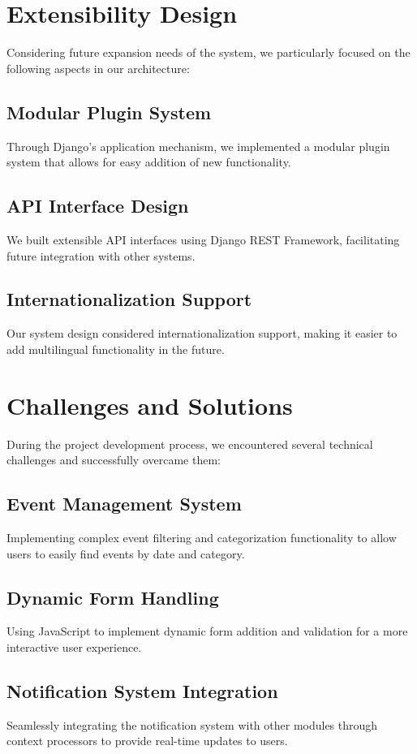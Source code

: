 \section{Extensibility Design}

Considering future expansion needs of the system, we particularly focused on the following aspects in our architecture:

\subsection{Modular Plugin System}
Through Django's application mechanism, we implemented a modular plugin system that allows for easy addition of new functionality.

\subsection{API Interface Design}
We built extensible API interfaces using Django REST Framework, facilitating future integration with other systems.

\subsection{Internationalization Support}
Our system design considered internationalization support, making it easier to add multilingual functionality in the future.

\section{Challenges and Solutions}

During the project development process, we encountered several technical challenges and successfully overcame them:

\subsection{Event Management System}
Implementing complex event filtering and categorization functionality to allow users to easily find events by date and category.

\subsection{Dynamic Form Handling}
Using JavaScript to implement dynamic form addition and validation for a more interactive user experience.

\subsection{Notification System Integration}
Seamlessly integrating the notification system with other modules through context processors to provide real-time updates to users.


